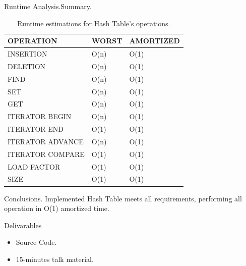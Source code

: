 \documentclass{beamer}
\begin{document}
\begin{frame}{Runtime Analysis.}{Summary.}
\begin{table}[]
\centering
\begin{tabular}{@{}lll@{}}
\toprule
\textbf{OPERATION} & \textbf{WORST} & \textbf{AMORTIZED} \\ \midrule
INSERTION          & O(n)           & O(1)               \\
DELETION           & O(n)           & O(1)               \\
FIND               & O(n)           & O(1)               \\
SET                & O(n)           & O(1)               \\
GET                & O(n)           & O(1)               \\
ITERATOR BEGIN     & O(n)           & O(1)               \\
ITERATOR END       & O(1)           & O(1)               \\
ITERATOR ADVANCE   & O(n)           & O(1)               \\
ITERATOR COMPARE   & O(1)           & O(1)               \\
LOAD FACTOR        & O(1)           & O(1)               \\
SIZE               & O(1)           & O(1)               \\ \bottomrule
\end{tabular}
\caption{Runtime estimations for Hash Table's operations.}
\label{my-label}

\end{table}
\end{frame}

\begin{frame}{Conclusions.}{}
  Implemented Hash Table meets all requirements, performing all operation in O(1) amortized time.
  \par
  Delivarables
  \begin{itemize}
  \item Source Code.
  \item 15-minutes talk material.
  \end{itemize}
\end{frame}
\end{document}
